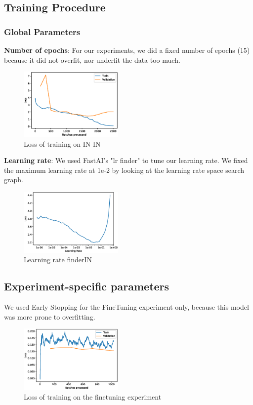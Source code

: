\documentclass{article}
\begin{document}
\subsection{Training Procedure}

\subsubsection{Global Parameters}

\textbf{Number of epochs}: For our experiments, we did a fixed number of epochs (15) because it did not overfit, nor underfit the data too much.
\begin{figure}[h!]
  \includegraphics[width = 0.45\textwidth]{imgs/sin/loss}
  \caption{Loss of training on IN \texorpdfstring{\textrightarrow} .IN}
  \label{fig:loss_in}
\end{figure}

\textbf{Learning rate}: We used FastAI's "lr finder" to tune our learning rate.
We fixed the maximum learning rate at 1e-2 by looking at the learning rate space search graph.
\begin{figure}[h!]
  \includegraphics[width = 0.45\textwidth]{imgs/lr_find.eps}
  \caption{Learning rate finder\texorpdfstring{\textrightarrow} .IN}
  \label{fig:loss_in}
\end{figure}

\subsection{Experiment-specific parameters}
We used Early Stopping for the FineTuning experiment only, because this model was more prone to overfitting.

\begin{figure}[h!]
  \includegraphics[width = 0.45\textwidth]{imgs/sinin/finetune/loss.eps}
  \caption{Loss of training on the finetuning experiment}
  \label{fig:loss_in}
\end{figure}
\end{document}
